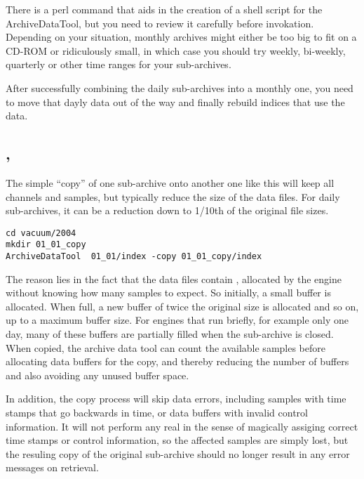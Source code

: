 There is a perl command  that aids in the
creation of a shell script for the ArchiveDataTool, but you need to
review it carefully before invokation.
Depending on your situation, monthly archives might either
be too big to fit on a CD-ROM or ridiculously small, in which case you
should try weekly, bi-weekly, quarterly or other time ranges for your sub-archives.

After successfully combining the daily sub-archives into a monthly one,
you need to move that dayly data out of the way and finally
rebuild indices that use the data.

\subsection{, }
The simple ``copy'' of one sub-archive onto another one like this will
keep all channels and samples, but typically reduce the size of the
data files.  For daily sub-archives, it can be a reduction down to
1/10th of the original file sizes.

\begin{lstlisting}[frame=none,keywordstyle=\sffamily]
cd vacuum/2004
mkdir 01_01_copy
ArchiveDataTool  01_01/index -copy 01_01_copy/index
\end{lstlisting}

The reason lies in the fact that the data files contain ,
allocated by the engine without knowing how many samples to expect. So
initially, a small buffer is allocated. When full, a new buffer of
twice the original size is allocated and so on, up to a maximum buffer
size. For engines that run briefly, for example only one day, many of these
buffers are partially filled when the sub-archive is closed.
When copied, the archive data tool can count the available samples
before allocating data buffers for the copy, and thereby reducing the
number of buffers and also avoiding any unused buffer space.

In addition, the copy process will skip data errors,
including samples with time stamps that go backwards in time,
or data buffers with invalid control information.
It will not perform any real  in the sense
of magically assiging correct time stamps or control information, so
the affected samples are simply lost, but the resuling copy of the
original sub-archive should no longer result in any error messages on retrieval.


